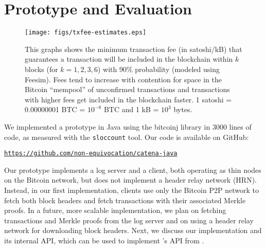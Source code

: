 \section{Prototype and Evaluation}
\label{sec:prototype}

\begin{figure*}[t]
	\centering
	\texttt{[image: figs/txfee-estimates.eps]}
	\vspace{-.9cm}
	\caption{This graphs shows the minimum transaction fee (in satoshi/kB) that guarantees a transaction will be included in the blockchain within $k$ blocks (for $k=1,2,3,6$) with 90\% probability (modeled using Feesim\cite{bitcoin-fees-github}). Fees tend to increase with contention for space in the Bitcoin ``mempool'' of unconfirmed transactions and transactions with higher fees get included in the blockchain faster. 1 satoshi = 0.00000001 BTC = $10^{-8}$ BTC and 1 kB = $10^3$ bytes.}
	\label{fig:fees}
\end{figure*}

We implemented a \Sys prototype in Java using the bitcoinj\cite{bitcoinj} library in 3000 lines of code, as measured with the \texttt{sloccount} tool.
Our code is available on GitHub: 

\begin{center}
\href{https://github.com/non-equivocation/catena-java}{\texttt{\footnotesize https://github.com/non-equivocation/catena-java}}
\end{center}

Our prototype implements a \Sys log server and a \Sys client, both operating as thin nodes on the Bitcoin network, but does not implement a header relay network (HRN).
Instead, in our first implementation, \Sys clients use only the Bitcoin P2P network to fetch both block headers and fetch \Sys transactions with their associated Merkle proofs.
In a future, more scalable implementation, we plan on fetching transactions and Merkle proofs from the log server and on using a header relay network for downloading block headers.
Next, we discuss our implementation and its internal API, which can be used to implement \Sys's API from .

